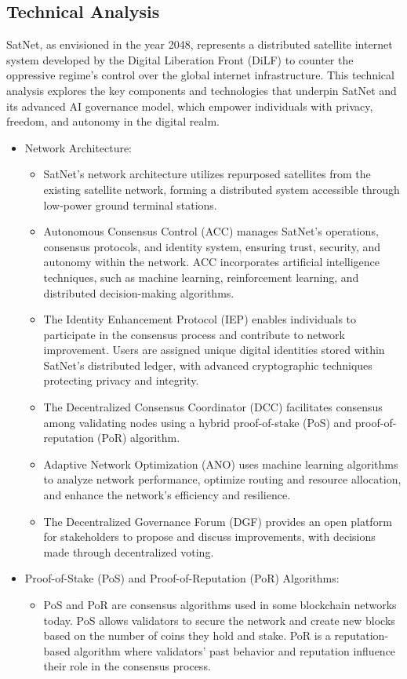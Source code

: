 \documentclass{article}
\theoremstyle{theorem}
\theoremstyle{definition}
\theoremstyle{remark}
\begin{document}
\subsection{Technical Analysis}

SatNet, as envisioned in the year 2048, represents a distributed satellite internet system developed by the Digital Liberation Front (DiLF) to counter the oppressive regime's control over the global internet infrastructure. This technical analysis explores the key components and technologies that underpin SatNet and its advanced AI governance model, which empower individuals with privacy, freedom, and autonomy in the digital realm.

\begin{itemize}
\item Network Architecture:
\begin{itemize}
\item SatNet's network architecture utilizes repurposed satellites from the existing satellite network, forming a distributed system accessible through low-power ground terminal stations.
\item Autonomous Consensus Control (ACC) manages SatNet's operations, consensus protocols, and identity system, ensuring trust, security, and autonomy within the network. ACC incorporates artificial intelligence techniques, such as machine learning, reinforcement learning, and distributed decision-making algorithms.
\item The Identity Enhancement Protocol (IEP) enables individuals to participate in the consensus process and contribute to network improvement. Users are assigned unique digital identities stored within SatNet's distributed ledger, with advanced cryptographic techniques protecting privacy and integrity.
\item The Decentralized Consensus Coordinator (DCC) facilitates consensus among validating nodes using a hybrid proof-of-stake (PoS) and proof-of-reputation (PoR) algorithm.
\item Adaptive Network Optimization (ANO) uses machine learning algorithms to analyze network performance, optimize routing and resource allocation, and enhance the network's efficiency and resilience.
\item The Decentralized Governance Forum (DGF) provides an open platform for stakeholders to propose and discuss improvements, with decisions made through decentralized voting.
\end{itemize}

\item Proof-of-Stake (PoS) and Proof-of-Reputation (PoR) Algorithms:
\begin{itemize}
\item PoS and PoR are consensus algorithms used in some blockchain networks today. PoS allows validators to secure the network and create new blocks based on the number of coins they hold and stake. PoR is a reputation-based algorithm where validators' past behavior and reputation influence their role in the consensus process.
\end{itemize}


\end{itemize}
\end{document}
